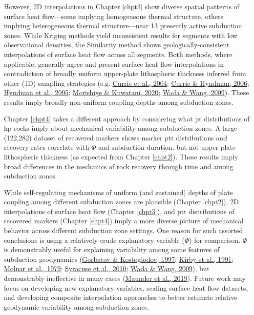However, 2D interpolations in Chapter \ref{chpt3} show diverse spatial patterns of surface heat flow---some implying homogeneous thermal structure, others implying heterogeneous thermal structure---near 13 presently active subduction zones. While Kriging methods yield inconsistent results for segments with low observational densities, the Similarity method shows geologically-consistent interpolations of surface heat flow across all segments. Both methods, where applicable, generally agree and present surface heat flow interpolations in contradiction of broadly uniform upper-plate lithospheric thickness inferred from other (1D) sampling strategies (e.g. \protect\hyperlink{ref-currie2004}{Currie et al., 2004}; \protect\hyperlink{ref-currie2006}{Currie \& Hyndman, 2006}; \protect\hyperlink{ref-hyndman2005}{Hyndman et al., 2005}; \protect\hyperlink{ref-morishige2020}{Morishige \& Kuwatani, 2020}; \protect\hyperlink{ref-wada2009}{Wada \& Wang, 2009}). These results imply broadly non-uniform coupling depths among subduction zones.

Chapter \ref{chpt4} takes a different approach by considering what \gls{pt} distributions of \gls{hp} rocks imply about mechanical variability among subduction zones. A large (122,282) dataset of recovered markers shows marker \gls{ptt} distributions and recovery rates correlate with \(\Phi\) and subduction duration, but not upper-plate lithospheric thickness (as expected from Chapter \ref{chpt2}). These results imply broad differences in the mechanics of rock recovery through time and among subduction zones.

While self-regulating mechanisms of uniform (and sustained) depths of plate coupling among different subduction zones are plausible (Chapter \ref{chpt2}), 2D interpolations of surface heat flow (Chapter \ref{chpt3}), and \gls{ptt} distributions of recovered markers (Chapter \ref{chpt4}) imply a more diverse picture of mechanical behavior across different subduction zone settings. One reason for such assorted conclusions is using a relatively crude explanatory variable (\(\Phi\)) for comparison. \(\Phi\) is demonstrably useful for explaining variability among some features of subduction geodynamics (\protect\hyperlink{ref-gorbatov1997}{Gorbatov \& Kostoglodov, 1997}; \protect\hyperlink{ref-kirby1991}{Kirby et al., 1991}; \protect\hyperlink{ref-molnar1979}{Molnar et al., 1979}; \protect\hyperlink{ref-syracuse2010}{Syracuse et al., 2010}; \protect\hyperlink{ref-wada2009}{Wada \& Wang, 2009}), but demonstrably ineffective in many cases (\protect\hyperlink{ref-maunder2019}{Maunder et al., 2019}). Future work may focus on developing new explanatory variables, scaling surface heat flow datasets, and developing composite interpolation approaches to better estimate relative geodynamic variability among subduction zones.

